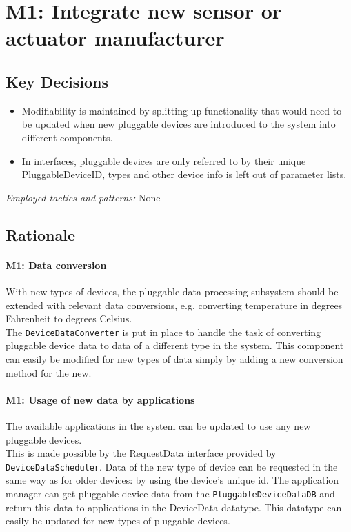 \section{M1: Integrate new sensor or actuator manufacturer}

    \subsection*{Key Decisions}

    \begin{itemize}
    	\item Modifiability is maintained by splitting up functionality that would need to be updated
              when new pluggable devices are introduced to the system into different components.
        \item In interfaces, pluggable devices are only referred to by their unique PluggableDeviceID,
              types and other device info is left out of parameter lists.
              
    \end{itemize}
    \emph{Employed tactics and patterns:} None

    \subsection*{Rationale}
        \paragraph{M1: Data conversion}
            With new types of devices, the pluggable data processing subsystem
            should be extended with relevant data conversions,
            e.g. converting temperature in degrees Fahrenheit to degrees Celsius. \\
            The \texttt{DeviceDataConverter} is put in place to handle the
            task of converting pluggable device data to data of a different type in the system.
            This component can easily be modified for new types of data simply by
            adding a new conversion method for the new.

        \paragraph{M1: Usage of new data by applications}
            The available applications in the system can be updated to use any
            new pluggable devices. \\
            This is made possible by the RequestData
            interface provided by \texttt{DeviceDataScheduler}.
            Data of the new type of device can be requested in the same way
            as for older devices: by using the device's unique id.
            The application manager can get pluggable device data from the
            \texttt{PluggableDeviceDataDB} and return this data to applications in
            the DeviceData datatype. This datatype can easily be
            updated for new types of pluggable devices.

